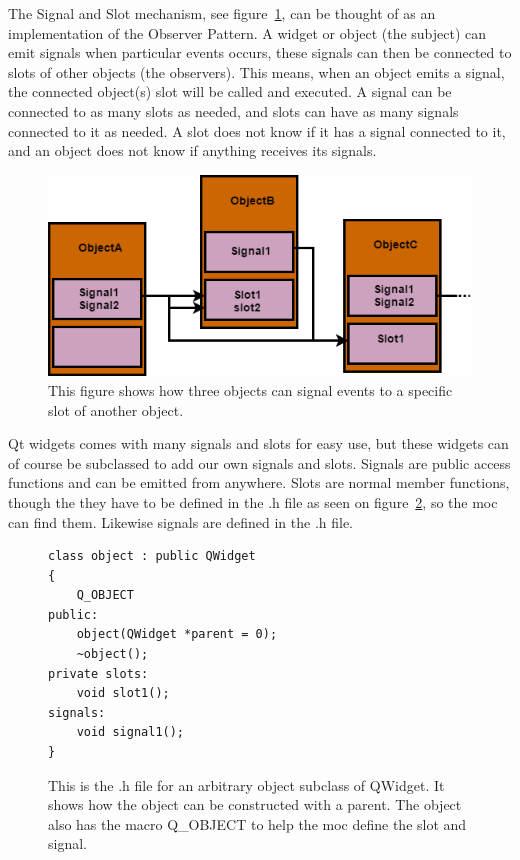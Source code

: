 The Signal and Slot mechanism, see figure~\ref{fig:SignalAndSlots}, can be thought of as an implementation of the Observer Pattern. A widget or object (the subject) can emit signals when particular events occurs, these signals can then be connected to slots of other objects (the observers). This means, when an object emits a signal, the connected object(s) slot will be called and executed. A signal can be connected to as many slots as needed, and slots can have as many signals connected to it as needed. A slot does not know if it has a signal connected to it, and an object does not know if anything receives its signals.   

\begin{figure}[h]
	\centering
	\includegraphics[scale=0.55]{Figures/SignalsAndSlots.png}
	\caption{This figure shows how three objects can signal events to a specific slot of another object.}
	\label{fig:SignalAndSlots}
\end{figure}

Qt widgets comes with many signals and slots for easy use, but these widgets can of course be subclassed to add our own signals and slots. Signals are public access functions and can be emitted from anywhere. Slots are normal member functions, though the they have to be defined in the .h file as seen on figure~\ref{fig:subClassQWidget}, so the moc can find them. Likewise signals are defined in the .h file.

\begin{figure}[h]
\centering
\lstset{language=C++} 
\begin{lstlisting}[frame=single] 
class object : public QWidget
{
	Q_OBJECT
public:
	object(QWidget *parent = 0);
	~object();
private slots:
	void slot1();
signals:
	void signal1();
}
\end{lstlisting}
\caption{This is the .h file for an arbitrary object subclass of QWidget. It shows how the object can be constructed with a parent. The object also has the macro Q\_OBJECT to help the moc define the slot and signal.}
\label{fig:subClassQWidget} 	
\end{figure}

